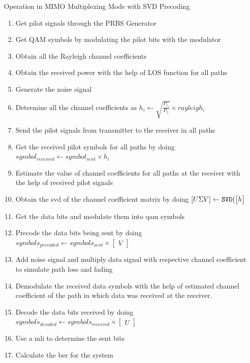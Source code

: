 \begin{algorithm}[!htbp]
\caption{Operation in MIMO Multiplexing Mode with SVD Precoding}
\label{alg:Operation in MIMO SVD Mode}
\begin{enumerate}
\item Get pilot signals through the PRBS Generator
\item Get QAM symbols by modulating the pilot bits with the modulator
\item Obtain all the Rayleigh channel coefficients
\item Obtain the received power with the help of LOS function for all  paths
\item Generate the noise signal
\item Determine all the channel coefficients as $h_i \gets \sqrt{\frac{P_{r_i}}{P_{t_i}}} \times rayleigh_i$
\item Send the pilot signals from transmitter to the receiver in all paths
\item Get the received pilot symbols for all paths by doing $symbol_{received} \gets symbol_{sent} \times h_i$
\item Estimate the value of channel coefficients for all paths at the receiver with the help of received pilot signals
\item Obtain the \acrlong{svd} of the channel coefficient matrix by doing $[U \Sigma V] \gets \verb|SVD|(\begin{bmatrix} h \end{bmatrix}$
\item Get the data bits and modulate them into \acrshort{qam} symbols
\item Precode the data bits being sent by doing $symbols_{precoded} \gets symbols_{sent} \times \begin{bmatrix} V \end{bmatrix}$
\item Add noise signal and multiply data signal with respective channel coefficient to simulate path loss and fading
\item Demodulate the received data symbols with the help of estimated channel coefficient of the path in which data was received at the receiver.
\item Decode the data bits received by doing $symbols_{decoded} \gets symbols_{received} \times \begin{bmatrix} U \end{bmatrix}$
\item Use a \acrlong{mli} to determine the sent bits
\item Calculate the \acrshort{ber} for the system
\end{enumerate}
\end{algorithm}

